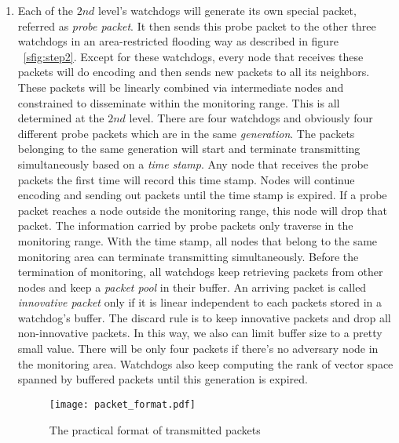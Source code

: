 \documentclass[conference]{IEEEtran}
\begin{document}
\begin{enumerate}
\item \label{st2}Each of the $2nd$ level's watchdogs will generate its own special packet, referred as \emph{probe packet}. It then sends this probe packet to the other three watchdogs in an area-restricted flooding way as described in figure ~\ref{sfig:step2}. Except for these watchdogs, every node that receives these packets will do encoding and then sends new packets to all its neighbors. These packets will be linearly combined via intermediate nodes and constrained to disseminate within the monitoring range. This is all determined at the $2nd$ level. There are four watchdogs and obviously four different probe packets which are in the same \emph{generation}. The packets belonging to the same generation will start and terminate transmitting simultaneously based on a \emph{time stamp}. Any node that receives the probe packets the first time will record this time stamp. Nodes will continue encoding and sending out packets until the time stamp is expired. If a probe packet reaches a node outside the monitoring range, this node will drop that packet. The information carried by probe packets only traverse in the monitoring range. With the time stamp, all nodes that belong to the same monitoring area can terminate transmitting simultaneously. Before the termination of monitoring, all watchdogs keep retrieving packets from other nodes and keep a \emph{packet pool} in their buffer. An arriving packet is called \emph{innovative packet} only if it is linear independent to each packets stored in a watchdog's buffer. The discard rule is to keep innovative packets and drop all non-innovative packets. In this way, we also can limit buffer size to a pretty small value. There will be only four packets if there's no adversary node in the monitoring area. Watchdogs also keep computing the rank of vector space spanned by buffered packets until this generation is expired. \\
\begin{figure}[!t]
\centering
\texttt{[image: packet\_format.pdf]}
\caption{The practical format of transmitted packets}
\label{fig_packet_form}
\end{figure}

\end{enumerate}
\end{document}
